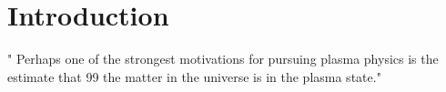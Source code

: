 

\chapter{Introduction} %
\label{Chapter1}

"
Perhaps one of the strongest motivations for pursuing plasma physics is the estimate that 99%
the matter in the universe is in the plasma state."